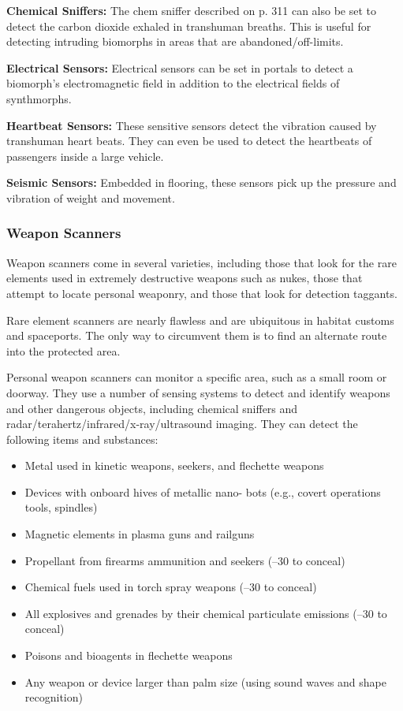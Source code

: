 \textbf{Chemical Sniffers:} The chem sniffer described on p. 311 can also be set to detect the carbon dioxide exhaled in transhuman breaths. This is useful for detecting intruding biomorphs in areas that are abandoned/off-limits. 

\textbf{Electrical Sensors:} Electrical sensors can be set in portals to detect a biomorph's electromagnetic field in addition to the electrical fields of synthmorphs. 

\textbf{Heartbeat Sensors:} These sensitive sensors detect the vibration caused by transhuman heart beats. They can even be used to detect the heartbeats of passengers inside a large vehicle. 

\textbf{Seismic Sensors:} Embedded in flooring, these sensors pick up the pressure and vibration of weight and movement. 

\subsubsection{Weapon Scanners} 

Weapon scanners come in several varieties, including those that look for the rare elements used in extremely destructive weapons such as nukes, those that attempt to locate personal weaponry, and those that look for detection taggants. 

Rare element scanners are nearly flawless and are ubiquitous in habitat customs and spaceports. The only way to circumvent them is to find an alternate route into the protected area. 

Personal weapon scanners can monitor a specific area, such as a small room or doorway. They use a number of sensing systems to detect and identify weapons and other dangerous objects, including chemical sniffers and radar/terahertz/infrared/x-ray/ultrasound imaging. They can detect the following items and substances: 

\begin{itemize} \item Metal used in kinetic weapons, seekers, and flechette weapons \item Devices with onboard hives of metallic nano- bots (e.g., covert operations tools, spindles) \item Magnetic elements in plasma guns and railguns \item Propellant from firearms ammunition and seekers (–30 to conceal) \item Chemical fuels used in torch spray weapons (–30 to conceal) \item All explosives and grenades by their chemical particulate emissions (–30 to conceal) \item Poisons and bioagents in flechette weapons \item Any weapon or device larger than palm size (using sound waves and shape recognition) \end{itemize} 

